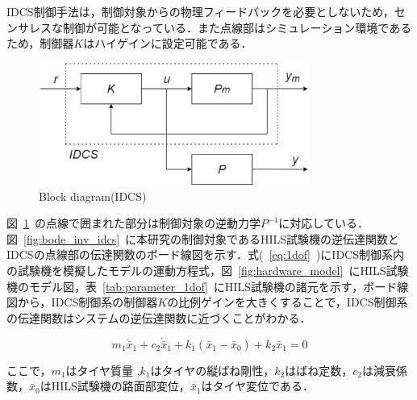 \documentclass[a4paper,12pt]{article_vdlab_sotsuron}
\begin{document}
IDCS制御手法は，制御対象からの物理フィードバックを必要としないため，センサレスな制御が可能となっている．また点線部はシミュレーション環境であるため，制御器$K$はハイゲインに設定可能である．

\vspace*{10mm}
\begin{figure}[htp]
  \begin{center}
    \includegraphics[height=40mm]{figure/idcs_block.eps}
    \vspace*{3mm}
    \caption{Block diagram(IDCS)}
    \label{fig:idcs_block}
  \end{center}
\end{figure}

\newpage

図~\ref{fig:idcs_block}~の点線で囲まれた部分は制御対象の逆動力学$P^{-1}$に対応している．図~\ref{fig:bode_inv_idcs}~に本研究の制御対象であるHILS試験機の逆伝達関数とIDCSの点線部の伝達関数のボード線図を示す．式(~\ref{eq:1dof}~)にIDCS制御系内の試験機を模擬したモデルの運動方程式，図~\ref{fig:hardware_model}~にHILS試験機のモデル図，表~\ref{tab:parameter_1dof}~にHILS試験機の諸元を示す，ボード線図から，IDCS制御系の制御器$K$の比例ゲインを大きくすることで，IDCS制御系の伝達関数はシステムの逆伝達関数に近づくことがわかる．

\begin{equation}
  m_1\ddot{\bar{x}}_1+c_2\dot{\bar{x}}_1+k_1(\bar{x}_1-\bar{x}_0)+k_2\bar{x}_1=0 \label{eq:1dof}
\end{equation}

ここで，$m_1$はタイヤ質量 ,$k_1$はタイヤの縦ばね剛性，$k_2$はばね定数，$c_2$は減衰係数，$\bar{x}_0$はHILS試験機の路面部変位，$\bar{x}_1$はタイヤ変位である．
\end{document}
